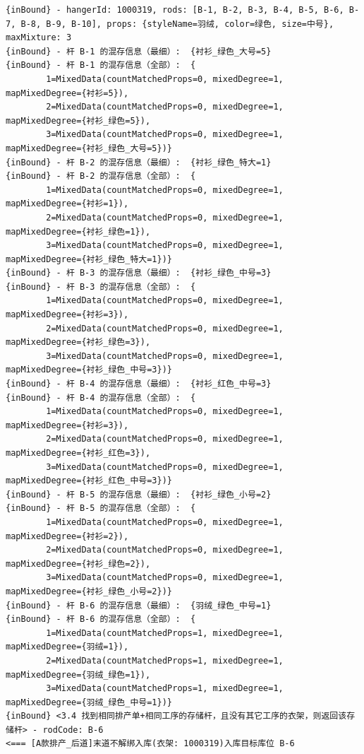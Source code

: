 {\begin{verbatim}
{inBound} - hangerId: 1000319, rods: [B-1, B-2, B-3, B-4, B-5, B-6, B-7, B-8, B-9, B-10], props: {styleName=羽绒, color=绿色, size=中号}, maxMixture: 3
{inBound} - 杆 B-1 的混存信息（最细）:  {衬衫_绿色_大号=5}
{inBound} - 杆 B-1 的混存信息（全部）:  {
		1=MixedData(countMatchedProps=0, mixedDegree=1, mapMixedDegree={衬衫=5}), 
		2=MixedData(countMatchedProps=0, mixedDegree=1, mapMixedDegree={衬衫_绿色=5}), 
		3=MixedData(countMatchedProps=0, mixedDegree=1, mapMixedDegree={衬衫_绿色_大号=5})}
{inBound} - 杆 B-2 的混存信息（最细）:  {衬衫_绿色_特大=1}
{inBound} - 杆 B-2 的混存信息（全部）:  {
		1=MixedData(countMatchedProps=0, mixedDegree=1, mapMixedDegree={衬衫=1}), 
		2=MixedData(countMatchedProps=0, mixedDegree=1, mapMixedDegree={衬衫_绿色=1}), 
		3=MixedData(countMatchedProps=0, mixedDegree=1, mapMixedDegree={衬衫_绿色_特大=1})}
{inBound} - 杆 B-3 的混存信息（最细）:  {衬衫_绿色_中号=3}
{inBound} - 杆 B-3 的混存信息（全部）:  {
		1=MixedData(countMatchedProps=0, mixedDegree=1, mapMixedDegree={衬衫=3}), 
		2=MixedData(countMatchedProps=0, mixedDegree=1, mapMixedDegree={衬衫_绿色=3}), 
		3=MixedData(countMatchedProps=0, mixedDegree=1, mapMixedDegree={衬衫_绿色_中号=3})}
{inBound} - 杆 B-4 的混存信息（最细）:  {衬衫_红色_中号=3}
{inBound} - 杆 B-4 的混存信息（全部）:  {
		1=MixedData(countMatchedProps=0, mixedDegree=1, mapMixedDegree={衬衫=3}), 
		2=MixedData(countMatchedProps=0, mixedDegree=1, mapMixedDegree={衬衫_红色=3}), 
		3=MixedData(countMatchedProps=0, mixedDegree=1, mapMixedDegree={衬衫_红色_中号=3})}
{inBound} - 杆 B-5 的混存信息（最细）:  {衬衫_绿色_小号=2}
{inBound} - 杆 B-5 的混存信息（全部）:  {
		1=MixedData(countMatchedProps=0, mixedDegree=1, mapMixedDegree={衬衫=2}), 
		2=MixedData(countMatchedProps=0, mixedDegree=1, mapMixedDegree={衬衫_绿色=2}), 
		3=MixedData(countMatchedProps=0, mixedDegree=1, mapMixedDegree={衬衫_绿色_小号=2})}
{inBound} - 杆 B-6 的混存信息（最细）:  {羽绒_绿色_中号=1}
{inBound} - 杆 B-6 的混存信息（全部）:  {
		1=MixedData(countMatchedProps=1, mixedDegree=1, mapMixedDegree={羽绒=1}), 
		2=MixedData(countMatchedProps=1, mixedDegree=1, mapMixedDegree={羽绒_绿色=1}), 
		3=MixedData(countMatchedProps=1, mixedDegree=1, mapMixedDegree={羽绒_绿色_中号=1})}
{inBound} <3.4 找到相同排产单+相同工序的存储杆，且没有其它工序的衣架，则返回该存储杆> - rodCode: B-6
<=== [A款排产_后道]末道不解绑入库(衣架: 1000319)入库目标库位 B-6


\end{verbatim}}
